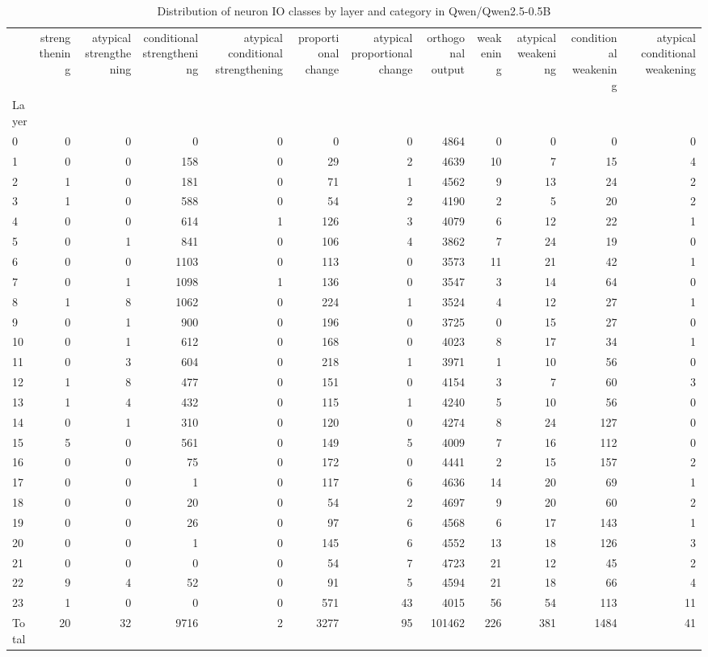 \begin{table}
\caption{Distribution of neuron IO classes by layer and category in Qwen/Qwen2.5-0.5B}
\label{tab:Qwen/Qwen2.5-0.5B}
\begin{tabular}{lrrrrrrrrrrr}
 & strengthening & atypical strengthening & conditional strengthening & atypical conditional strengthening & proportional change & atypical proportional change & orthogonal output & weakening & atypical weakening & conditional weakening & atypical conditional weakening \\
Layer &  &  &  &  &  &  &  &  &  &  &  \\
0 & 0 & 0 & 0 & 0 & 0 & 0 & 4864 & 0 & 0 & 0 & 0 \\
1 & 0 & 0 & 158 & 0 & 29 & 2 & 4639 & 10 & 7 & 15 & 4 \\
2 & 1 & 0 & 181 & 0 & 71 & 1 & 4562 & 9 & 13 & 24 & 2 \\
3 & 1 & 0 & 588 & 0 & 54 & 2 & 4190 & 2 & 5 & 20 & 2 \\
4 & 0 & 0 & 614 & 1 & 126 & 3 & 4079 & 6 & 12 & 22 & 1 \\
5 & 0 & 1 & 841 & 0 & 106 & 4 & 3862 & 7 & 24 & 19 & 0 \\
6 & 0 & 0 & 1103 & 0 & 113 & 0 & 3573 & 11 & 21 & 42 & 1 \\
7 & 0 & 1 & 1098 & 1 & 136 & 0 & 3547 & 3 & 14 & 64 & 0 \\
8 & 1 & 8 & 1062 & 0 & 224 & 1 & 3524 & 4 & 12 & 27 & 1 \\
9 & 0 & 1 & 900 & 0 & 196 & 0 & 3725 & 0 & 15 & 27 & 0 \\
10 & 0 & 1 & 612 & 0 & 168 & 0 & 4023 & 8 & 17 & 34 & 1 \\
11 & 0 & 3 & 604 & 0 & 218 & 1 & 3971 & 1 & 10 & 56 & 0 \\
12 & 1 & 8 & 477 & 0 & 151 & 0 & 4154 & 3 & 7 & 60 & 3 \\
13 & 1 & 4 & 432 & 0 & 115 & 1 & 4240 & 5 & 10 & 56 & 0 \\
14 & 0 & 1 & 310 & 0 & 120 & 0 & 4274 & 8 & 24 & 127 & 0 \\
15 & 5 & 0 & 561 & 0 & 149 & 5 & 4009 & 7 & 16 & 112 & 0 \\
16 & 0 & 0 & 75 & 0 & 172 & 0 & 4441 & 2 & 15 & 157 & 2 \\
17 & 0 & 0 & 1 & 0 & 117 & 6 & 4636 & 14 & 20 & 69 & 1 \\
18 & 0 & 0 & 20 & 0 & 54 & 2 & 4697 & 9 & 20 & 60 & 2 \\
19 & 0 & 0 & 26 & 0 & 97 & 6 & 4568 & 6 & 17 & 143 & 1 \\
20 & 0 & 0 & 1 & 0 & 145 & 6 & 4552 & 13 & 18 & 126 & 3 \\
21 & 0 & 0 & 0 & 0 & 54 & 7 & 4723 & 21 & 12 & 45 & 2 \\
22 & 9 & 4 & 52 & 0 & 91 & 5 & 4594 & 21 & 18 & 66 & 4 \\
23 & 1 & 0 & 0 & 0 & 571 & 43 & 4015 & 56 & 54 & 113 & 11 \\
Total & 20 & 32 & 9716 & 2 & 3277 & 95 & 101462 & 226 & 381 & 1484 & 41 \\
\end{tabular}
\end{table}
